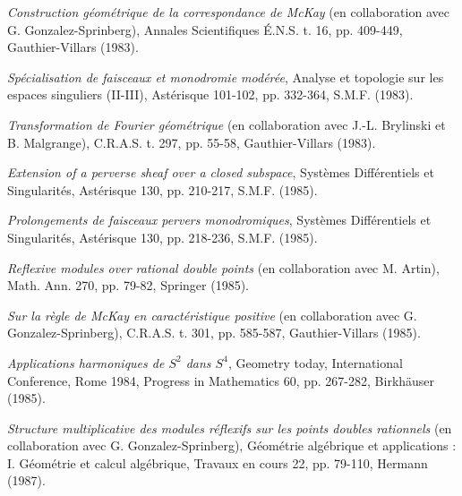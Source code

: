 \begin{description}
\item[{[37]}] \emph{Construction géométrique de la correspondance de McKay}
(en collaboration avec G. Gonzalez-Sprinberg), Annales Scientifiques É.N.S.
t. 16, pp. 409-449, Gauthier-Villars (1983).

\item[{[38]}] \emph{Spécialisation de faisceaux et monodromie modérée},
Analyse et topologie sur les espaces singuliers (II-III), Astérisque 101-102,
pp. 332-364, S.M.F. (1983).

\item[{[39]}] \emph{Transformation de Fourier géométrique} (en collaboration
avec J.-L. Brylinski et B. Malgrange), C.R.A.S. t. 297, pp. 55-58,
Gauthier-Villars (1983).

\item[{[40]}] \emph{Extension of a perverse sheaf over a closed subspace},
Systèmes Différentiels et Singularités, Astérisque 130, pp. 210-217,
S.M.F. (1985).

\item[{[41]}] \emph{Prolongements de faisceaux pervers monodromiques},
Systèmes Différentiels et Singularités, Astérisque 130, pp. 218-236,
S.M.F. (1985).

\item[{[42]}] \emph{Reflexive modules over rational double points}
(en collaboration avec M. Artin), Math. Ann. 270, pp. 79-82,
Springer (1985).

\item[{[43]}] \emph{Sur la règle de McKay en caractéristique positive}
(en collaboration avec G. Gonzalez-Sprinberg), C.R.A.S. t. 301,
pp. 585-587, Gauthier-Villars (1985).

\item[{[44]}] \emph{Applications harmoniques de $S^2$ dans $S^4$},
Geometry today, International Conference, Rome 1984, Progress in Mathematics
60, pp. 267-282, Birkhäuser (1985).

\item[{[45]}] \emph{Structure multiplicative des modules réflexifs sur les
points doubles rationnels} (en collaboration avec G. Gonzalez-Sprinberg),
Géométrie algébrique et applications : I. Géométrie et calcul algébrique,
Travaux en cours 22, pp. 79-110, Hermann (1987).


\end{description}
